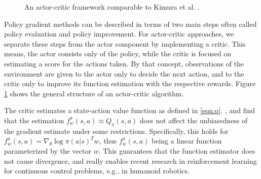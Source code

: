 \begin{figure}
  \caption{An actor-critic framework comparable to Kimura et al.  \cite{Kimura1998AnAO}.} \label{fig:ac}
\end{figure}

Policy gradient methods can be described in terms of two main steps often called policy evaluation and policy improvement. 
For actor-critic approaches, we separate these steps from the actor component by implementing a critic. 
This means, the actor consists only of the policy, while the critic is focused on estimating a score for the actions taken. 
By that concept, observations of the environment are given to the actor only to decide the next action, and to the critic only to improve its function estimation with the respective rewards. 
Figure \ref{fig:ac} shows the general structure of an actor-critic algorithm.

The critic estimates a state-action value function as defined in \eqref{eqn:q}. 
\cite{Sutton:1999:PGM:3009657.3009806}, and \cite{Konda:2003:AA:942271.942292} find that the estimation $f_w^\pi(s,a) \approx Q_\pi(s,a)$ does not affect the unbiasedness of the gradient estimate under some restrictions. 
Specifically, this holds for $f_w^\pi(s,a) = {\nabla_\theta \log\pi(a|s)}^T w$, thus $f_w^\pi(s,a)$ being a linear function parameterized by the vector $w$.
This guarantees that the function estimator does not cause divergence, and really enables recent research in reinforcement learning for continuous control problems, e.g., in humanoid robotics.

